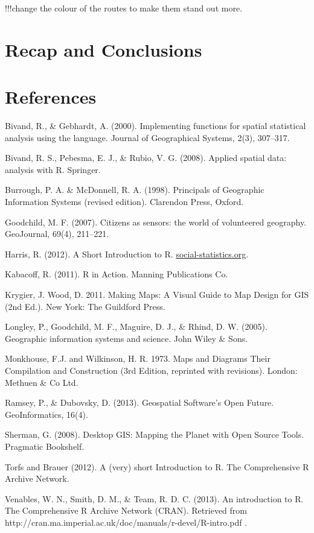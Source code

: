 \documentclass[]{article}
\begin{document}
!!!change the colour of the routes to make them stand out more.

\section{Recap and Conclusions}

\newpage \section{References}

Bivand, R., \& Gebhardt, A. (2000). Implementing functions for spatial
statistical analysis using the language. Journal of Geographical
Systems, 2(3), 307--317.

Bivand, R. S., Pebesma, E. J., \& Rubio, V. G. (2008). Applied spatial
data: analysis with R. Springer.

Burrough, P. A. \& McDonnell, R. A. (1998). Principals of Geographic
Information Systems (revised edition). Clarendon Press, Oxford.

Goodchild, M. F. (2007). Citizens as sensors: the world of volunteered
geography. GeoJournal, 69(4), 211--221.

Harris, R. (2012). A Short Introduction to R.
\href{http://www.social-statistics.org/}{social-statistics.org}.

Kabacoff, R. (2011). R in Action. Manning Publications Co.

Krygier, J. Wood, D. 2011. Making Maps: A Visual Guide to Map Design for
GIS (2nd Ed.). New York: The Guildford Press.

Longley, P., Goodchild, M. F., Maguire, D. J., \& Rhind, D. W. (2005).
Geographic information systems and science. John Wiley \& Sons.

Monkhouse, F.J. and Wilkinson, H. R. 1973. Maps and Diagrams Their
Compilation and Construction (3rd Edition, reprinted with revisions).
London: Methuen \& Co Ltd.

Ramsey, P., \& Dubovsky, D. (2013). Geospatial Software's Open Future.
GeoInformatics, 16(4).

Sherman, G. (2008). Desktop GIS: Mapping the Planet with Open Source
Tools. Pragmatic Bookshelf.

Torfs and Brauer (2012). A (very) short Introduction to R. The
Comprehensive R Archive Network.

Venables, W. N., Smith, D. M., \& Team, R. D. C. (2013). An introduction
to R. The Comprehensive R Archive Network (CRAN). Retrieved from
http://cran.ma.imperial.ac.uk/doc/manuals/r-devel/R-intro.pdf .
\end{document}
